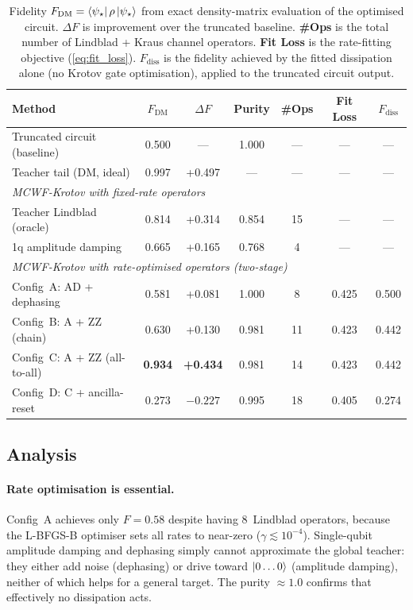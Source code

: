 \documentclass[11pt,a4paper]{article}
\begin{document}
\begin{table}[ht]
\centering
\begin{tabular}{@{}lcccccc@{}}
\toprule
\textbf{Method} & \textbf{$F_\text{DM}$} & $\Delta F$
& \textbf{Purity} & \textbf{\#Ops}
& \textbf{Fit Loss} & $F_\text{diss}$ \\
\midrule
Truncated circuit (baseline)
  & 0.500 & ---   & 1.000 & --- & --- & --- \\
Teacher tail (DM, ideal)
  & 0.997 & +0.497 & ---  & --- & --- & --- \\
\midrule
\multicolumn{7}{l}{\textit{MCWF-Krotov with fixed-rate operators}} \\
\quad Teacher Lindblad (oracle)
  & 0.814 & +0.314 & 0.854 & 15 & --- & --- \\
\quad 1q amplitude damping
  & 0.665 & +0.165 & 0.768 &  4 & --- & --- \\
\midrule
\multicolumn{7}{l}{\textit{MCWF-Krotov with rate-optimised operators (two-stage)}} \\
\quad Config~A: AD + dephasing
  & 0.581 & +0.081 & 1.000 &  8 & 0.425 & 0.500 \\
\quad Config~B: A + ZZ (chain)
  & 0.630 & +0.130 & 0.981 & 11 & 0.423 & 0.442 \\
\quad Config~C: A + ZZ (all-to-all)
  & \textbf{0.934} & \textbf{+0.434} & 0.981 & 14 & 0.423 & 0.442 \\
\quad Config~D: C + ancilla-reset
  & 0.273 & $-0.227$ & 0.995 & 18 & 0.405 & 0.274 \\
\bottomrule
\end{tabular}
\caption{%
Fidelity $F_\text{DM} = \bra{\psi_\star}\rho\ket{\psi_\star}$
from exact density-matrix evaluation of the optimised circuit.
$\Delta F$ is improvement over the truncated baseline.
\textbf{\#Ops} is the total number of Lindblad + Kraus channel
operators.  \textbf{Fit Loss} is the rate-fitting objective
(\ref{eq:fit_loss}).
$F_\text{diss}$ is the fidelity achieved by the fitted dissipation
alone (no Krotov gate optimisation), applied to the truncated
circuit output.
}
\label{tab:extended}
\end{table}

\subsection{Analysis}

\paragraph{Rate optimisation is essential.}
Config~A achieves only $F = 0.58$ despite having 8~Lindblad operators,
because the L-BFGS-B optimiser sets all rates to near-zero
($\gamma \lesssim 10^{-4}$).  Single-qubit amplitude damping and
dephasing simply cannot approximate the global teacher: they either
add noise (dephasing) or drive toward $\ket{0\ldots 0}$ (amplitude
damping), neither of which helps for a general target.  The
purity $\approx 1.0$ confirms that effectively no dissipation acts.
\end{document}

